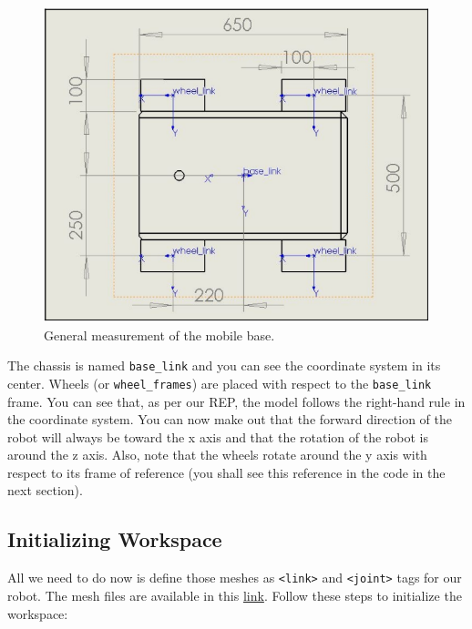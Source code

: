 \documentclass[letterpaper,pdftex]{article}
\begin{document}
\begin{figure}
\centering
\includegraphics[scale=0.5]{mobile_measurements.png}
\caption{General measurement of the mobile base.}
\end{figure}

The chassis is named \verb|base_link| and you can see the coordinate system in its center. Wheels (or \verb|wheel_frames|) are placed with respect to the \verb|base_link| frame. You can see that, as per our REP, the model follows the right-hand rule in the coordinate system. You can now make out that the forward direction of the robot will always be toward the x axis and that the rotation of the robot is around the z axis. Also, note that the wheels rotate around the y axis with respect to its frame of reference (you shall see this reference in the code in the next section).

\subsection{Initializing Workspace}

All we need to do now is define those meshes as \verb|<link>| and \verb|<joint>| tags for our robot. The mesh files are available in this \href{https://github.com/nikorose87/robotics_labs/tree/main/Lab2/Resources/meshes}{link}. Follow these steps to initialize the workspace:
\end{document}
